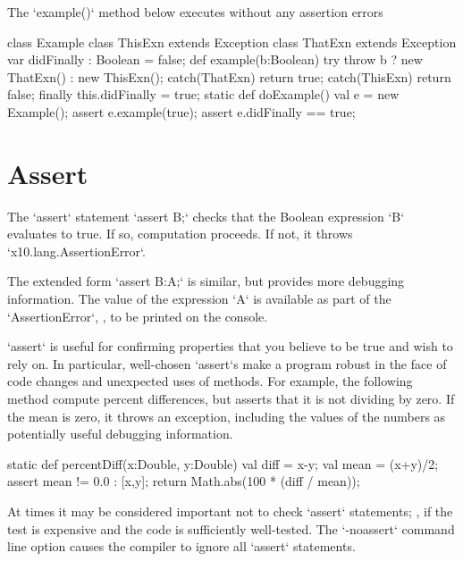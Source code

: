 \begin{ex}
The \xcd`example()` method below executes without any assertion errors
% 
\begin{xten}
class Example {
  class ThisExn extends Exception {}
  class ThatExn extends Exception {}
  var didFinally : Boolean = false;
  def example(b:Boolean) {
    try {
       throw b ? new ThatExn() : new ThisExn();
    }
    catch(ThatExn) {return true;}
    catch(ThisExn) {return false;}
    finally {
       this.didFinally = true;
    }
  }
  static def doExample() {
    val e = new Example();
    assert e.example(true);
    assert e.didFinally == true;
  }
}
\end{xten}
% 

\end{ex}


\section{Assert}

The \xcd`assert` statement 
\xcd`assert B;` 
checks that the Boolean expression \xcd`B` evaluates to true.  If so,
computation proceeds.  If not, it throws \xcd`x10.lang.AssertionError`.

The extended form 
\xcd`assert B:A;`
is similar, but provides more debugging information.  The value of the
expression \xcd`A` is available as part of the \xcd`AssertionError`, \eg, to
be printed on the console.

\begin{ex}
\xcd`assert` is useful for confirming properties that you believe to be true
and wish to rely on.  In particular, well-chosen \xcd`assert`s make a program
robust in the face of code changes and unexpected uses of methods.
For example, the following method compute percent differences, but asserts
that it is not dividing by zero.  If the mean is zero, it throws an exception,
including the values of the numbers as potentially useful debugging
information. 
\begin{xten}
static def percentDiff(x:Double, y:Double) {
  val diff = x-y;
  val mean = (x+y)/2;
  assert mean != 0.0  : [x,y]; 
  return Math.abs(100 * (diff / mean));
}
\end{xten}

\end{ex}


At times it may be considered important not to check \xcd`assert` statements;
\eg, if the test is expensive and the code is sufficiently well-tested.  The
\xcd`-noassert` command line option causes the compiler to ignore all
\xcd`assert` statements. 

